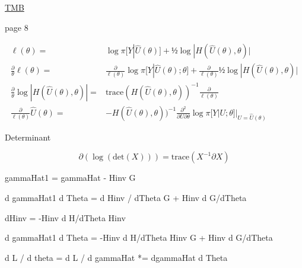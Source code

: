 \href{https://www.jstatsoft.org/article/view/v070i05}{TMB}

page 8

\[
\begin{aligned}
\ell(\theta) = &\log \pi[ Y|\hat U(\theta)] + ½ \log | H(\hat U(\theta), \theta) | \\
\frac{\partial}{\theta} \ell(\theta) = & \frac{\partial}{\ell(\theta)} \log \pi[ Y|\hat U(\theta);\theta] + 
    \frac{\partial}{\ell(\theta)} ½ \log | H(\hat U(\theta), \theta) | \\
  \frac{\partial}{\theta} \log | H(\hat U(\theta), \theta) |   = & 
    \text{trace}( H(\hat U(\theta), \theta))^{-1}  \frac{\partial }{\ell(\theta)} \\
\frac{\partial}{\ell(\theta)} \hat U(\theta) = & - H(\hat U(\theta), \theta))^{-1}    
    \frac{\partial^2}{\partial U \partial \theta} \log \pi[ Y| U;\theta] |_{U = \hat U(\theta)}
\end{aligned}
\]

Determinant

\[
  ∂(\log(\text{det}(X))) = \text{trace}(X^{−1} ∂X)
\]

gammaHat1 = gammaHat - Hinv G

d gammaHat1 d Theta = d Hinv / dTheta G + Hinv d G/dTheta

dHinv = -Hinv d H/dTheta Hinv

d gammaHat1 d Theta = -Hinv d H/dTheta Hinv G + Hinv d G/dTheta

d L / d theta = d L / d gammaHat *= dgammaHat d Theta
